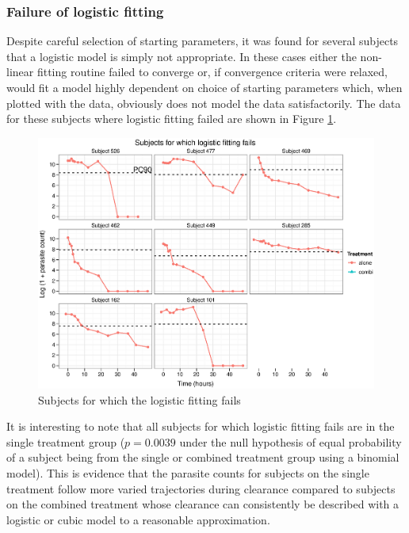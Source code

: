\subsubsection*{Failure of logistic fitting}
Despite careful selection of starting parameters, it was found for several subjects that a logistic model is simply not appropriate. In these cases either the non-linear fitting routine failed to converge or, if convergence criteria were relaxed, would fit a model highly dependent on choice of starting parameters which, when plotted with the data, obviously does not model the data satisfactorily. The data for these subjects where logistic fitting failed are shown in Figure \ref{failures}.
\begin{figure}[h]
\includegraphics[width=150mm]{failures.eps} 
\caption{Subjects for which the logistic fitting fails}\label{failures}
\end{figure}

It is interesting to note that all subjects for which logistic fitting fails are in the single treatment group ($p=0.0039$ under the null hypothesis of equal probability of a subject being from the single or combined treatment group using a binomial model). This is evidence that the parasite counts for subjects on the single treatment follow more varied trajectories during clearance compared to subjects on the combined treatment whose clearance can consistently be described with a logistic or cubic model to a reasonable approximation.

